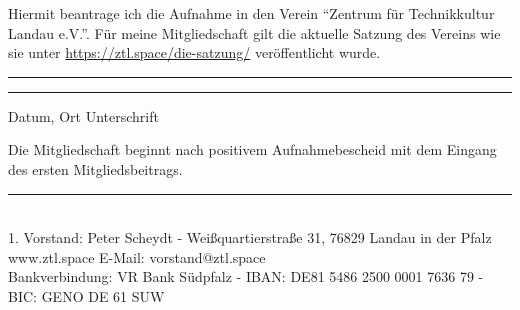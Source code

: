 \documentclass[a4paper, 11pt]{scrartcl}
\begin{document}
Hiermit beantrage ich die Aufnahme in den Verein "`Zentrum für Technikkultur Landau e.V."'. Für meine Mitgliedschaft gilt die aktuelle Satzung des Vereins wie sie unter \url{https://ztl.space/die-satzung/} veröffentlicht wurde.\\

\vspace{50pt}
\noindent\rule{5cm}{.4pt}\hfill\rule{5cm}{.4pt}\par
\noindent Datum, Ort \hspace{9.8cm} Unterschrift
\vspace{50pt}

Die Mitgliedschaft beginnt nach positivem Aufnahmebescheid mit dem Eingang des ersten Mitgliedsbeitrags.

\vspace{50pt}
\begin{center}
\rule{15cm}{.4pt}\\ 
1. Vorstand: Peter Scheydt - Weißquartierstraße 31, 76829 Landau in der Pfalz \\
www.ztl.space E-Mail: vorstand@ztl.space \\
Bankverbindung: VR Bank Südpfalz - IBAN: DE81 5486 2500 0001 7636 79 - BIC: GENO DE 61 SUW

\end{center}
\end{document}
